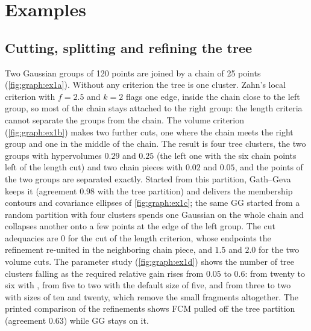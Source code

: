 \section{Examples}\label{sec:graph:examples}

\subsection{Cutting, splitting and refining the tree}

Two Gaussian groups of 120 points are joined by a chain of 25 points (\cref{fig:graph:ex1a}). Without any criterion the tree is one cluster. Zahn's local criterion with $f=2.5$ and $k=2$ flags one edge, inside the chain close to the left group, so most of the chain stays attached to the right group: the length criteria cannot separate the groups from the chain. The volume criterion (\cref{fig:graph:ex1b}) makes two further cuts, one where the chain meets the right group and one in the middle of the chain. The result is four tree clusters, the two groups with hypervolumes $0.29$ and $0.25$ (the left one with the six chain points left of the length cut) and two chain pieces with $0.02$ and $0.05$, and the points of the two groups are separated exactly. Started from this partition, Gath--Geva keeps it (agreement $0.98$ with the tree partition) and delivers the membership contours and covariance ellipses of \cref{fig:graph:ex1c}; the same GG started from a random partition with four clusters spends one Gaussian on the whole chain and collapses another onto a few points at the edge of the left group. The cut adequacies are $0$ for the cut of the length criterion, whose endpoints the refinement re-united in the neighboring chain piece, and $1.5$ and $2.0$ for the two volume cuts. The parameter study (\cref{fig:graph:ex1d}) shows the number of tree clusters falling as the required relative gain rises from $0.05$ to $0.6$: from twenty to six with , from five to two with the default size of five, and from three to two with sizes of ten and twenty, which remove the small fragments altogether. The printed comparison of the refinements shows FCM pulled off the tree partition (agreement $0.63$) while GG stays on it.

